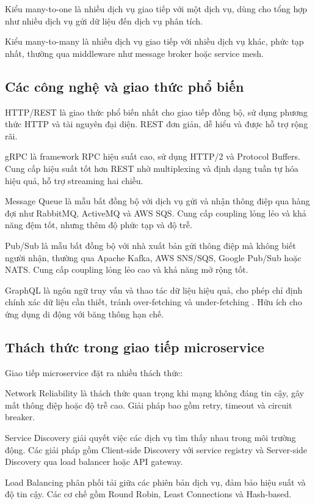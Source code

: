Kiểu many-to-one là nhiều dịch vụ giao tiếp với một dịch vụ, dùng cho tổng hợp như nhiều dịch vụ gửi dữ liệu đến dịch vụ phân tích.

Kiểu many-to-many là nhiều dịch vụ giao tiếp với nhiều dịch vụ khác, phức tạp nhất, thường qua middleware như message broker hoặc service mesh.

\subsection{Các công nghệ và giao thức phổ biến}
HTTP/REST là giao thức phổ biến nhất cho giao tiếp đồng bộ, sử dụng phương thức HTTP và tài nguyên đại diện. REST đơn giản, dễ hiểu và được hỗ trợ rộng rãi.

gRPC là framework RPC hiệu suất cao, sử dụng HTTP/2 và Protocol Buffers. Cung cấp hiệu suất tốt hơn REST nhờ multiplexing và định dạng tuần tự hóa hiệu quả, hỗ trợ streaming hai chiều.

Message Queue là mẫu bất đồng bộ với dịch vụ gửi và nhận thông điệp qua hàng đợi như RabbitMQ, ActiveMQ và AWS SQS. Cung cấp coupling lỏng lẻo và khả năng đệm tốt, nhưng thêm độ phức tạp và độ trễ.

Pub/Sub là mẫu bất đồng bộ với nhà xuất bản gửi thông điệp mà không biết người nhận, thường qua Apache Kafka, AWS SNS/SQS, Google Pub/Sub hoặc NATS. Cung cấp coupling lỏng lẻo cao và khả năng mở rộng tốt.

GraphQL là ngôn ngữ truy vấn và thao tác dữ liệu hiệu quả, cho phép chỉ định chính xác dữ liệu cần thiết, tránh over-fetching và under-fetching \cite{richardson2019}. Hữu ích cho ứng dụng di động với băng thông hạn chế.
 
\subsection{Thách thức trong giao tiếp microservice}
Giao tiếp microservice đặt ra nhiều thách thức:

Network Reliability là thách thức quan trọng khi mạng không đáng tin cậy, gây mất thông điệp hoặc độ trễ cao. Giải pháp bao gồm retry, timeout và circuit breaker.

Service Discovery giải quyết việc các dịch vụ tìm thấy nhau trong môi trường động. Các giải pháp gồm Client-side Discovery với service registry và Server-side Discovery qua load balancer hoặc API gateway.

Load Balancing phân phối tải giữa các phiên bản dịch vụ, đảm bảo hiệu suất và độ tin cậy. Các cơ chế gồm Round Robin, Least Connections và Hash-based.

